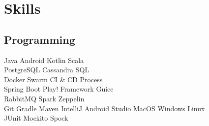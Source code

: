 \documentclass[]{deedy-resume-openfont}
\begin{document}
\begin{minipage}[t]{0.33\textwidth}
%


\section{Skills}
\subsection{Programming}
Java \textbullet{}   
Android \textbullet{} 
Kotlin \textbullet{} 
Scala \\
PostgreSQL \textbullet{}   
Cassandra \textbullet{} 
SQL \\
Docker \textbullet{} 
Swarm \textbullet{} 
CI \& CD Process\\
Spring Boot \textbullet{} 
Play! Framework \textbullet{} 
Guice \\
RabbitMQ \textbullet{} 
Spark \textbullet{}
Zeppelin \\
Git \textbullet{} 
Gradle \textbullet{} 
Maven \textbullet{}
IntelliJ \textbullet{}
Android Studio \textbullet{} 
MacOS \textbullet{} 
Windows \textbullet{} 
Linux \\
JUnit \textbullet{} 
Mockito \textbullet{} 
Spock \\
\sectionsep

\end{minipage}
\end{document}
